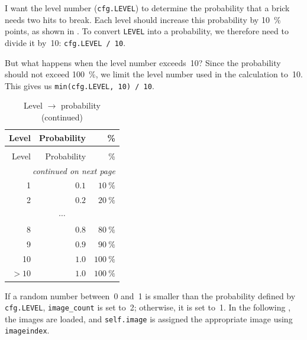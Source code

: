I want the level number (\texttt{cfg.LEVEL}) to determine the probability that a brick needs two hits to break. Each level should increase this probability by \SI{10}{\percent} points, as shown in . To convert \texttt{LEVEL} into a probability, we therefore need to divide it by~10: \texttt{cfg.LEVEL / 10}.

But what happens when the level number exceeds~10? Since the probability should not exceed \SI{100}{\percent}, we limit the level number used in the calculation to~10. This gives us \texttt{min(cfg.LEVEL, 10) / 10}.

\begin{longtable}{rr@{ $\widehat{=}$ }r}
	\caption{Level $\rightarrow$ probability}\label{tabLevelProb} \\
	\toprule
	Level  & Probability & \%\\
	\midrule
	\endfirsthead %
	
	\caption{Level $\rightarrow$ probability (continued)}\\
	\toprule
	Level  & Probability & \%\\
	\midrule
	\endhead %
	
	\midrule
	\multicolumn{3}{r}{\emph{continued on next page}} \\
	\endfoot
	
	\bottomrule
	\endlastfoot
	1 &  $0.1$ & $\SI{10}{\%}$\\ 
	2 &  $0.2$ & $\SI{20}{\%}$\\ 
	\multicolumn{3}{c}{$\cdots$}\\
	8 &  $0.8$ & $\SI{80}{\%}$\\ 
	9 &  $0.9$ & $\SI{90}{\%}$\\ 
	10 &  $1.0$ & $\SI{100}{\%}$\\ 
	$>10$ &  $1.0$ & $\SI{100}{\%}$
\end{longtable} 

If a random number between~0 and~1 is smaller than the probability defined by \texttt{cfg.LEVEL}, \texttt{image\_count} is set to~2; otherwise, it is set to~1. In the following \forSchleife, the images are loaded, and \texttt{self.image} is assigned the appropriate image using \texttt{imageindex}.


